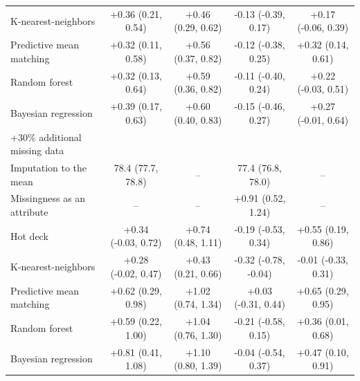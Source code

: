 \documentclass{article}
\begin{document}
\begin{table}
\begin{tabular}{lcccc}
K-nearest-neighbors & +0.36 (0.21, 0.54) & +0.46 (0.29, 0.62) & -0.13 (-0.39, 0.17) & +0.17 (-0.06, 0.39) \\ 
Predictive mean matching & +0.32 (0.11, 0.58) & +0.56 (0.37, 0.82) & -0.12 (-0.38, 0.25) & +0.32 (0.14, 0.61) \\ 
Random forest & +0.32 (0.13, 0.64) & +0.59 (0.36, 0.82) & -0.11 (-0.40, 0.24) & +0.22 (-0.03, 0.51) \\ 
Bayesian regression & +0.39 (0.17, 0.63) & +0.60 (0.40, 0.83) & -0.15 (-0.46, 0.27) & +0.27 (-0.01, 0.64) \\ 
\midrule
\multicolumn{1}{l}{+30\% additional missing data} \\ 
\midrule
Imputation to the mean & 78.4 (77.7, 78.8) & -- & 77.4 (76.8, 78.0) & -- \\ 
Missingness as an attribute & -- & -- & +0.91 (0.52, 1.24) & -- \\ 
Hot deck & +0.34 (-0.03, 0.72) & +0.74 (0.48, 1.11) & -0.19 (-0.53, 0.34) & +0.55 (0.19, 0.86) \\ 
K-nearest-neighbors & +0.28 (-0.02, 0.47) & +0.43 (0.21, 0.66) & -0.32 (-0.78, -0.04) & -0.01 (-0.33, 0.31) \\ 
Predictive mean matching & +0.62 (0.29, 0.98) & +1.02 (0.74, 1.34) & +0.03 (-0.31, 0.44) & +0.65 (0.29, 0.95) \\ 
Random forest & +0.59 (0.22, 1.00) & +1.04 (0.76, 1.30) & -0.21 (-0.58, 0.15) & +0.36 (0.01, 0.68) \\ 
Bayesian regression & +0.81 (0.41, 1.08) & +1.10 (0.80, 1.39) & -0.04 (-0.54, 0.37) & +0.47 (0.10, 0.91) \\ 
\bottomrule
\end{tabular} 
 \end{table}

\clearpage
\end{document}
